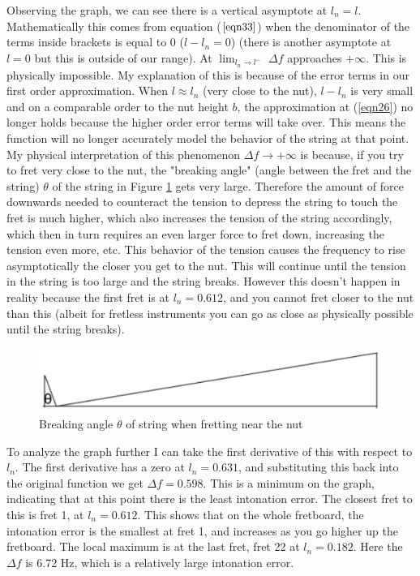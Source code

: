Observing the graph, we can see there is a vertical asymptote at $l_n = l$. Mathematically this comes from equation ($\ref{eqn33}$) when the denominator of the terms inside brackets is equal to 0 ($l-l_n = 0$) (there is another asymptote at $l=0$ but this is outside of our range). At $\lim_{l_n \to l^-}$ $\Delta f$ approaches $+\infty$. This is physically impossible. My explanation of this is because of the error terms in our first order approximation. When $l \approx l_n$ (very close to the nut), $l-l_n$ is very small and on a comparable order to the nut height $b$, the approximation at (\ref{eqn26}) no longer holds because the higher order error terms will take over. This means the function will no longer accurately model the behavior of the string at that point. My physical interpretation of this phenomenon $\Delta f \to +\infty $ is because, if you try to fret very close to the nut, the "breaking angle" (angle between the fret and the string) $\theta$ of the string in Figure \ref{fig9} gets very large. Therefore the amount of force downwards needed to counteract the tension to depress the string to touch the fret is much higher, which also increases the tension of the string accordingly, which then in turn requires an even larger force to fret down, increasing the tension even more, etc. This behavior of the tension causes the frequency to rise asymptotically the closer you get to the nut. This will continue until the tension in the string is too large and the string breaks. However this doesn't happen in reality because the first fret is at $l_n = 0.612$, and you cannot fret closer to the nut than this (albeit for fretless instruments you can go as close as physically possible until the string breaks). \par
\begin{figure}[!htb]
    \includegraphics[width=\textwidth]{./ee/breaking_angles.png}
    \caption{Breaking angle $\theta$ of string when fretting near the nut} \label{fig9}
\end{figure}
To analyze the graph further I can take the first derivative of this with respect to $l_n$. The first derivative has a zero at $l_n = 0.631$, and substituting this back into the original function we get $\Delta f = 0.598$. This is a minimum on the graph, indicating that at this point there is the least intonation error. The closest fret to this is fret 1, at $l_n = 0.612$. This shows that on the whole fretboard, the intonation error is the smallest at fret 1, and increases as you go higher up the fretboard. The local maximum is at the last fret, fret 22 at $l_n = 0.182$. Here the $\Delta f$ is 6.72 Hz, which is a relatively large intonation error. \par
